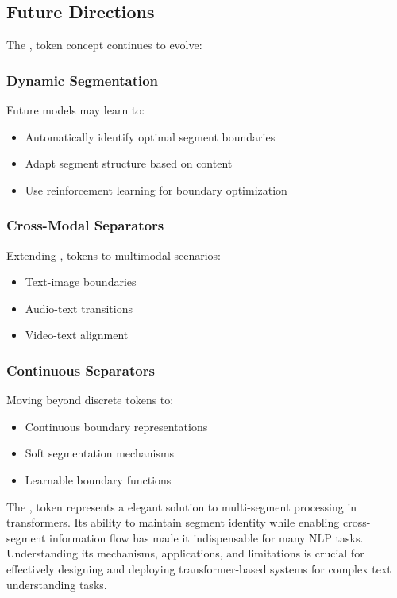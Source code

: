 \subsection{Future Directions}

The \sep{} token concept continues to evolve:

\subsubsection{Dynamic Segmentation}
Future models may learn to:
\begin{itemize}
\item Automatically identify optimal segment boundaries
\item Adapt segment structure based on content
\item Use reinforcement learning for boundary optimization
\end{itemize}

\subsubsection{Cross-Modal Separators}
Extending \sep{} tokens to multimodal scenarios:
\begin{itemize}
\item Text-image boundaries
\item Audio-text transitions
\item Video-text alignment
\end{itemize}

\subsubsection{Continuous Separators}
Moving beyond discrete tokens to:
\begin{itemize}
\item Continuous boundary representations
\item Soft segmentation mechanisms
\item Learnable boundary functions
\end{itemize}

The \sep{} token represents a elegant solution to multi-segment processing in transformers. Its ability to maintain segment identity while enabling cross-segment information flow has made it indispensable for many NLP tasks. Understanding its mechanisms, applications, and limitations is crucial for effectively designing and deploying transformer-based systems for complex text understanding tasks.